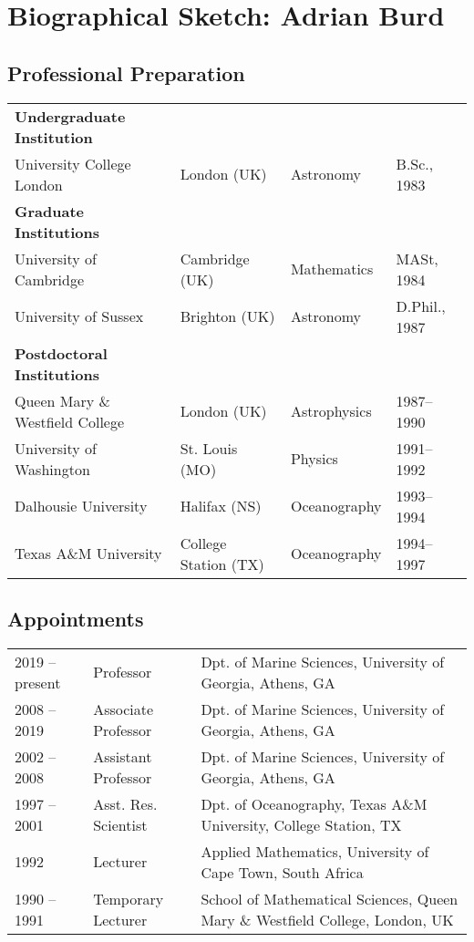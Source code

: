 \documentclass[nsfbio]{nsfproposal}
\begin{document}
\section*{Biographical Sketch: Adrian Burd}

\subsection{Professional Preparation}
\begin{tabular}[c]{llll}
  \textbf{Undergraduate Institution} & & & \\
  University College London & London (UK) & Astronomy & B.Sc., 1983 \\
  \textbf{Graduate Institutions} & & & \\
  University of Cambridge & Cambridge (UK) & Mathematics & MASt, 1984 \\
  University of Sussex & Brighton (UK) & Astronomy & D.Phil., 1987 \\
  \textbf{Postdoctoral Institutions} & & & \\
  Queen Mary \& Westfield College & London (UK) & Astrophysics & 1987--1990 \\
  University of Washington & St. Louis (MO) & Physics & 1991--1992 \\
  Dalhousie University & Halifax (NS) & Oceanography & 1993--1994 \\
  Texas A\&{}M University & College Station (TX) & Oceanography & 1994--1997
\end{tabular}

\subsection{Appointments}
\begin{tabularx}{\textwidth}{ l l Y }
  2019 -- present & Professor & Dpt. of Marine Sciences, University of Georgia, Athens, GA \\
  2008 -- 2019 & Associate Professor & Dpt. of Marine Sciences, University of Georgia, Athens, GA \\
  2002 -- 2008 & Assistant Professor & Dpt. of Marine Sciences, University of Georgia, Athens, GA \\
  1997 -- 2001 & Asst. Res. Scientist & Dpt. of Oceanography, Texas A\&{}M University, College Station, TX \\
  1992         & Lecturer & Applied Mathematics, University of Cape Town, South Africa \\
  1990 -- 1991 & Temporary Lecturer & School of Mathematical Sciences, Queen Mary \& Westfield College, London, UK
\end{tabularx}
\end{document}
